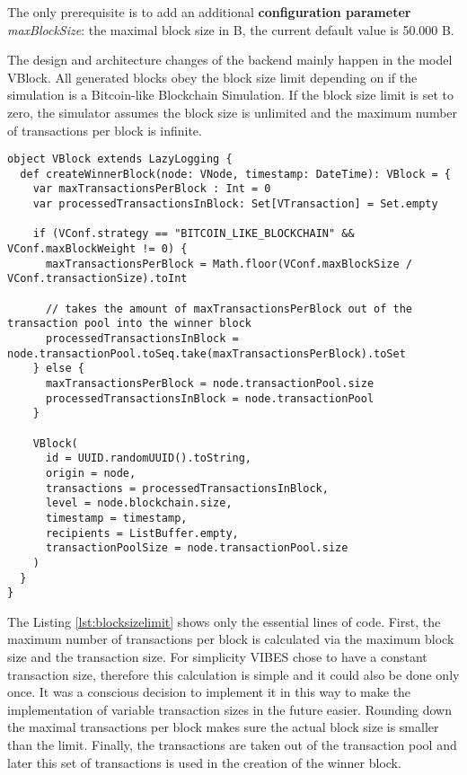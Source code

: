 The only prerequisite is to add an additional \textbf{configuration parameter} \textit{maxBlockSize}: the maximal block size in B, the current default value is 50.000 B.

The design and architecture changes of the backend mainly happen in the model VBlock. All generated blocks obey the block size limit depending on if the simulation is a Bitcoin-like Blockchain Simulation. If the block size limit is set to zero, the simulator assumes the block size is unlimited and the maximum number of transactions per block is infinite.

\begin{minipage}{\linewidth}
\begin{lstlisting}[style=myScalastyle,label=lst:blocksizelimit,caption={VBlock with focus on block size limit}]
object VBlock extends LazyLogging {
  def createWinnerBlock(node: VNode, timestamp: DateTime): VBlock = {
    var maxTransactionsPerBlock : Int = 0
    var processedTransactionsInBlock: Set[VTransaction] = Set.empty

    if (VConf.strategy == "BITCOIN_LIKE_BLOCKCHAIN" && VConf.maxBlockWeight != 0) {
      maxTransactionsPerBlock = Math.floor(VConf.maxBlockSize / VConf.transactionSize).toInt    
      
      // takes the amount of maxTransactionsPerBlock out of the transaction pool into the winner block
      processedTransactionsInBlock = node.transactionPool.toSeq.take(maxTransactionsPerBlock).toSet
    } else {
      maxTransactionsPerBlock = node.transactionPool.size
      processedTransactionsInBlock = node.transactionPool
    }
    
    VBlock(
      id = UUID.randomUUID().toString,
      origin = node,
      transactions = processedTransactionsInBlock,
      level = node.blockchain.size,
      timestamp = timestamp,
      recipients = ListBuffer.empty,
      transactionPoolSize = node.transactionPool.size
    )
  }
}
\end{lstlisting}
\end{minipage}

The Listing \ref{lst:blocksizelimit} shows only the essential lines of code. First, the maximum number of transactions per block is calculated via the maximum block size and the transaction size. For simplicity VIBES chose to have a constant transaction size, therefore this calculation is simple and it could also be done only once. It was a conscious decision to implement it in this way to make the implementation of variable transaction sizes in the future easier. Rounding down the maximal transactions per block makes sure the actual block size is smaller than the limit. Finally, the transactions are taken out of the transaction pool and later this set of transactions is used in the creation of the winner block.

